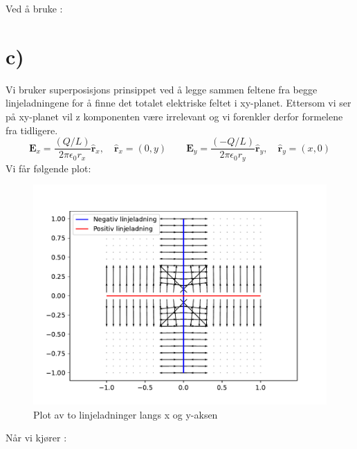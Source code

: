 \documentclass{article}
\begin{document}
  Ved å bruke :


\section*{c)}
  Vi bruker superposisjons prinsippet ved å legge sammen feltene fra begge linjeladningene for å finne det totalet elektriske feltet i xy-planet. Ettersom vi ser på xy-planet vil z komponenten være irrelevant og vi forenkler derfor formelene fra tidligere. 
  \[
  \mathbf{E}_x = \frac{(Q / L)}{2 \pi \epsilon_0 r_x} \mathbf{\hat{r}}_{x}, \quad \mathbf{\hat{r}}_x = (0, y) \qquad \mathbf{E}_{y} = \frac{(-Q / L)}{2 \pi \epsilon_0 r_y} \mathbf{\hat{r}}_{y}, \quad \mathbf{\hat{r}}_y = (x, 0)
  \]
  Vi får følgende plot: 
  \begin{figure}[h!]
    \centering
    \includegraphics[scale = .4]{Linjeladninger_c.pdf}
    \caption{Plot av to linjeladninger langs x og y-aksen}
    \label{fig:figure1}
  \end{figure}

  Når vi kjører :




    
  

    
\end{document}
